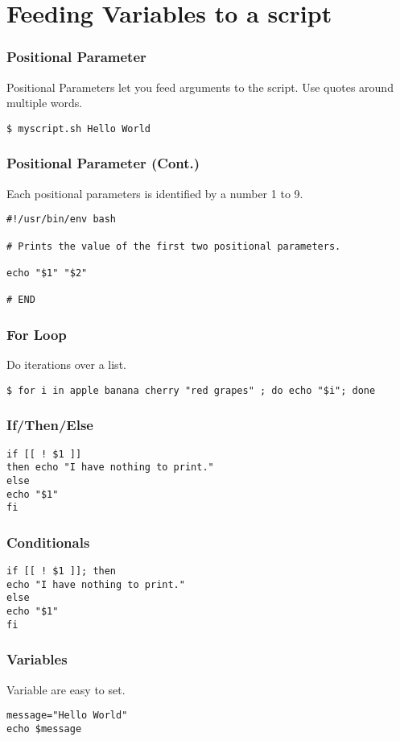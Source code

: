 \documentclass[12pt,handout,aspectratio=169]{beamer}
\begin{document}
\section{Feeding Variables to a script}

\begin{frame}[fragile]
  \frametitle{Positional Parameter}
  Positional Parameters let you feed arguments to the script. Use quotes around multiple words.
\begin{block}{}
\begin{verbatim}
$ myscript.sh Hello World
\end{verbatim}
\end{block}
\end{frame}
\begin{frame}[fragile]
  \frametitle{Positional Parameter (Cont.)}
  Each positional parameters is identified by a number 1 to 9.
\begin{block}{}
\begin{verbatim}
#!/usr/bin/env bash

# Prints the value of the first two positional parameters.

echo "$1" "$2"

# END
\end{verbatim}
\end{block}
\end{frame}
\begin{frame}[fragile]
  \frametitle{For Loop}
  Do iterations over a list.
\begin{verbatim}
$ for i in apple banana cherry "red grapes" ; do echo "$i"; done
\end{verbatim}
\end{frame}
\begin{frame}[fragile]
  \frametitle{If/Then/Else}
\begin{block}{}
\begin{verbatim}
if [[ ! $1 ]]
then echo "I have nothing to print."
else
echo "$1"
fi
\end{verbatim}
\end{block}
\end{frame}
\begin{frame}[fragile]
  \frametitle{Conditionals}
\begin{verbatim}
if [[ ! $1 ]]; then
echo "I have nothing to print."
else
echo "$1"
fi
\end{verbatim}
\end{frame}
\begin{frame}[fragile]
  \frametitle{Variables}
  Variable are easy to set.
\begin{verbatim}
message="Hello World"
echo $message
\end{verbatim}

\end{frame}
\end{document}
